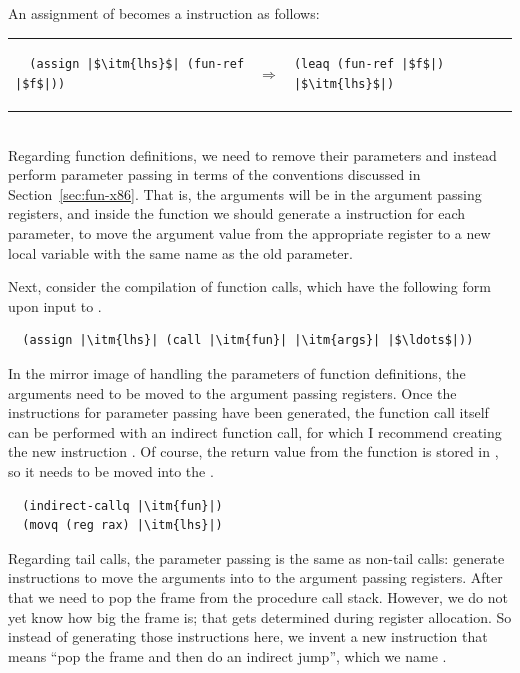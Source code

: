 \documentclass[11pt]{book}
\begin{document}
An assignment of  becomes a  instruction
as follows: \\
\begin{tabular}{lll}
\begin{minipage}{0.45\textwidth}
\begin{lstlisting}
  (assign |$\itm{lhs}$| (fun-ref |$f$|))
\end{lstlisting}
\end{minipage}
&
$\Rightarrow$
&
\begin{minipage}{0.4\textwidth}
\begin{lstlisting}
(leaq (fun-ref |$f$|) |$\itm{lhs}$|)
\end{lstlisting}
\end{minipage}
\end{tabular} \\


Regarding function definitions, we need to remove their parameters and
instead perform parameter passing in terms of the conventions
discussed in Section~\ref{sec:fun-x86}. That is, the arguments will be
in the argument passing registers, and inside the function we should
generate a  instruction for each parameter, to move the
argument value from the appropriate register to a new local variable
with the same name as the old parameter.

Next, consider the compilation of function calls, which have the
following form upon input to .
\begin{lstlisting}
  (assign |\itm{lhs}| (call |\itm{fun}| |\itm{args}| |$\ldots$|))
\end{lstlisting}
In the mirror image of handling the parameters of function
definitions, the arguments  need to be moved to the argument
passing registers.
%
Once the instructions for parameter passing have been generated, the
function call itself can be performed with an indirect function call,
for which I recommend creating the new instruction
. Of course, the return value from the function
is stored in , so it needs to be moved into the .
\begin{lstlisting}
  (indirect-callq |\itm{fun}|)
  (movq (reg rax) |\itm{lhs}|)
\end{lstlisting}

Regarding tail calls, the parameter passing is the same as non-tail
calls: generate instructions to move the arguments into to the
argument passing registers.  After that we need to pop the frame from
the procedure call stack.  However, we do not yet know how big the
frame is; that gets determined during register allocation. So instead
of generating those instructions here, we invent a new instruction
that means ``pop the frame and then do an indirect jump'', which we
name .
\end{document}
